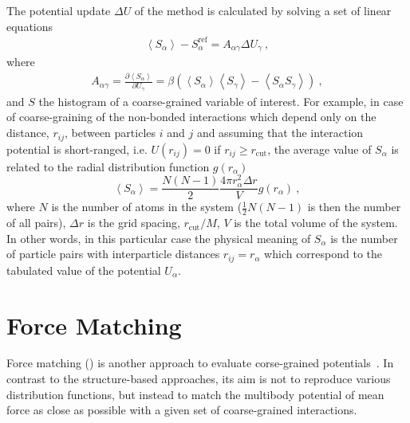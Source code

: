 The potential update $\Delta U$ of the \imc method is calculated by solving a set of linear equations
\begin{align}
    \left<S_{\alpha}\right> - S_{\alpha}^{\text{ref}}= A_{\alpha \gamma} \Delta U_{\gamma}~,
  \label{eq:imc}
\end{align}
%
where
\begin{eqnarray}
  \label{eq:covariance}
  A_{\alpha \gamma} = \frac{\partial \left< S_{\alpha} \right> }{\partial U_{\gamma}}  =
  \beta \left( \left<S_{\alpha} \right>\left<S_{\gamma} \right> - \left<S_{\alpha} S_{\gamma} \right>  \right)~,
  \nonumber
\end{eqnarray}
and $S$ the histogram of a coarse-grained variable of interest. For example, in case of coarse-graining of the non-bonded interactions which depend only on the distance, $r_{ij}$, between particles $i$ and $j$ and assuming that the interaction potential is short-ranged, i.e. $U(r_{ij})=0$ if $r_{ij} \ge r_{\text{cut} }$, the average value of $S_{\alpha}$ is related to the radial distribution function $g(r_{\alpha})$
%
\begin{equation}
   \left< S_{\alpha} \right> =  \frac{N(N-1)}{2} \frac{4 \pi r_{\alpha}^2 \Delta r} {V}g(r_{\alpha})~,
  \label{eq:s_mean}
\end{equation}
%
where $N$ is the number of atoms in the system ($\frac{1}{2} N(N-1)$ is then the number of all pairs), $\Delta r$ is the grid spacing, $r_{\text{cut}}/M$, $V$ is the total volume of the system. In other words, in this particular case the physical meaning of $S_{\alpha}$ is the number of particle pairs with interparticle distances $r_{ij} = r_{\alpha}$ which correspond to the tabulated value of the potential $U_{\alpha}$.


\section{Force Matching}
\label{sec:fm}



Force matching (\fm) is another approach to evaluate corse-grained potentials~\cite{Ercolessi:1994,Izvekov:2005,Noid:2007}. In contrast to the structure-based approaches, its aim is not to reproduce various distribution functions, but instead to match the multibody potential of mean force as close as possible with a given set of coarse-grained interactions.

